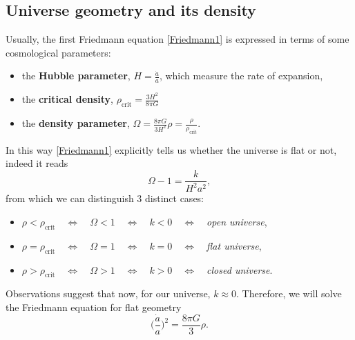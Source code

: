 \subsection{Universe geometry and its density}
Usually, the first Friedmann equation \eqref{Friedmann1} is expressed in terms of some cosmological parameters:
\begin{itemize}
    \item the \textbf{Hubble parameter}, $H=\frac{\dot a}{a}$, which measure the rate of expansion,
    \item the \textbf{critical density}, $\rho_{\text{crit}}=\frac{3H^2}{8\pi G}$
    \item the \textbf{density parameter}, $\Omega=\frac{8\pi G}{3H^2}\rho=\frac{\rho}{\rho_{\text{crit}}}$.
\end{itemize}
In this way \eqref{Friedmann1} explicitly tells us whether the universe is flat or not, indeed it reads
\begin{equation}
    \boxed{\Omega-1=\frac{k}{H^2a^2}},
\end{equation}
from which we can distinguish 3 distinct cases:
\begin{itemize}
    \item $\rho<\rho_{\text{crit}}\quad\Leftrightarrow\quad \Omega<1 \quad\Leftrightarrow\quad k<0 \quad\Leftrightarrow\quad $\emph{open universe},
    \item  $\rho=\rho_{\text{crit}}\quad\Leftrightarrow\quad \Omega=1 \quad\Leftrightarrow\quad k=0 \quad\Leftrightarrow\quad $\emph{flat universe},
    \item  $\rho>\rho_{\text{crit}}\quad\Leftrightarrow\quad \Omega>1 \quad\Leftrightarrow\quad k>0 \quad\Leftrightarrow\quad $\emph{closed universe}.
\end{itemize} 
Observations suggest that now, for our universe, $k\approx0$. Therefore, we will solve the Friedmann equation  for flat geometry$$\bigg(\frac{\dot a }{a}\bigg)^2=\frac{8\pi G}{3}\rho. $$
